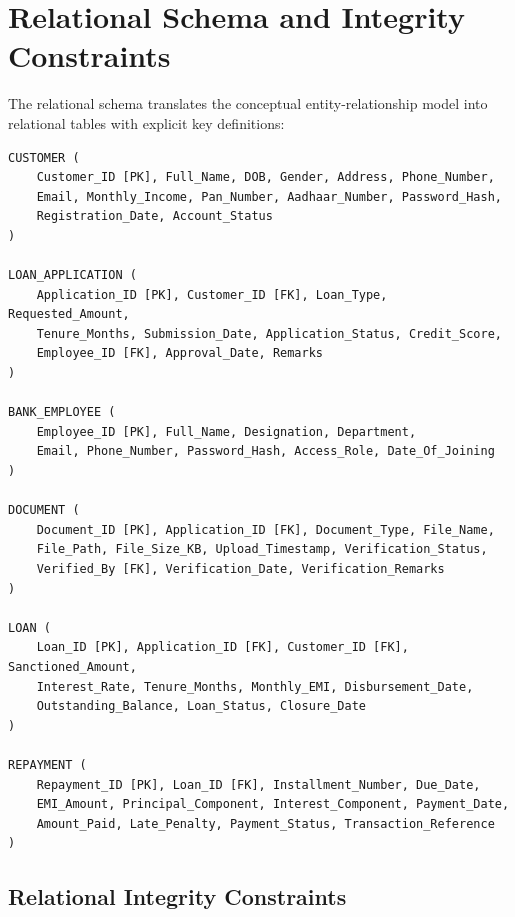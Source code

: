 \section{Relational Schema and Integrity Constraints}

The relational schema translates the conceptual entity-relationship model into relational tables with explicit key definitions:

\begin{lstlisting}
CUSTOMER (
    Customer_ID [PK], Full_Name, DOB, Gender, Address, Phone_Number, 
    Email, Monthly_Income, Pan_Number, Aadhaar_Number, Password_Hash, 
    Registration_Date, Account_Status
)

LOAN_APPLICATION (
    Application_ID [PK], Customer_ID [FK], Loan_Type, Requested_Amount, 
    Tenure_Months, Submission_Date, Application_Status, Credit_Score, 
    Employee_ID [FK], Approval_Date, Remarks
)

BANK_EMPLOYEE (
    Employee_ID [PK], Full_Name, Designation, Department, 
    Email, Phone_Number, Password_Hash, Access_Role, Date_Of_Joining
)

DOCUMENT (
    Document_ID [PK], Application_ID [FK], Document_Type, File_Name, 
    File_Path, File_Size_KB, Upload_Timestamp, Verification_Status, 
    Verified_By [FK], Verification_Date, Verification_Remarks
)

LOAN (
    Loan_ID [PK], Application_ID [FK], Customer_ID [FK], Sanctioned_Amount, 
    Interest_Rate, Tenure_Months, Monthly_EMI, Disbursement_Date, 
    Outstanding_Balance, Loan_Status, Closure_Date
)

REPAYMENT (
    Repayment_ID [PK], Loan_ID [FK], Installment_Number, Due_Date, 
    EMI_Amount, Principal_Component, Interest_Component, Payment_Date, 
    Amount_Paid, Late_Penalty, Payment_Status, Transaction_Reference
)
\end{lstlisting}

\subsection{Relational Integrity Constraints}

